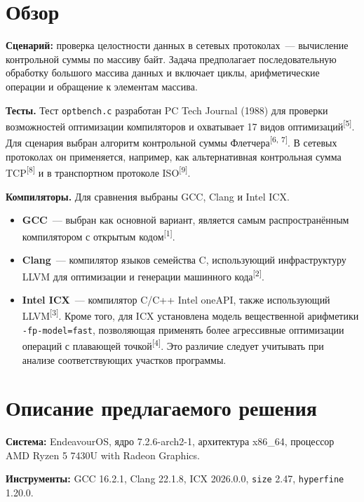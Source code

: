 \documentclass[a4paper]{article}
\begin{document}
\section{Обзор}

\textbf{Сценарий:} проверка целостности данных в сетевых протоколах~--- вычисление контрольной суммы по массиву байт. Задача предполагает последовательную обработку большого массива данных и включает циклы, арифметические операции и обращение к элементам массива.

\textbf{Тесты.} Тест \texttt{optbench.c} разработан PC Tech Journal (1988) для проверки возможностей оптимизации компиляторов и охватывает 17 видов оптимизаций\textsuperscript{[5]}. Для сценария выбран алгоритм контрольной суммы Флетчера\textsuperscript{[6, 7]}. В сетевых протоколах он применяется, например, как альтернативная контрольная сумма TCP\textsuperscript{[8]} и в транспортном протоколе ISO\textsuperscript{[9]}.

\textbf{Компиляторы.} Для сравнения выбраны GCC, Clang и Intel ICX.

\begin{itemize}
    \item \textbf{GCC}~--- выбран как основной вариант, является самым распространённым компилятором с открытым кодом\textsuperscript{[1]}.
    \item \textbf{Clang}~--- компилятор языков семейства C, использующий инфраструктуру LLVM для оптимизации и генерации машинного кода\textsuperscript{[2]}.
    \item \textbf{Intel ICX}~--- компилятор C/C++ Intel oneAPI, также использующий LLVM\textsuperscript{[3]}. Кроме того, для ICX установлена модель вещественной арифметики \texttt{-fp-model=fast}, позволяющая применять более агрессивные оптимизации операций с плавающей точкой\textsuperscript{[4]}. Это различие следует учитывать при анализе соответствующих участков программы.
\end{itemize}

\section{Описание предлагаемого решения}

\textbf{Система:} EndeavourOS, ядро 7.2.6-arch2-1, архитектура x86\_64, процессор AMD Ryzen 5 7430U with Radeon Graphics.

\textbf{Инструменты:} GCC 16.2.1, Clang 22.1.8, ICX 2026.0.0, \texttt{size} 2.47, \texttt{hyperfine} 1.20.0.
\end{document}
